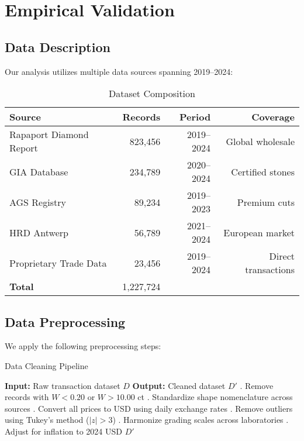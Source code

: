 \documentclass[12pt,a4paper]{article}
\begin{document}
\section{Empirical Validation}
\label{sec:empirical}

\subsection{Data Description}

Our analysis utilizes multiple data sources spanning 2019--2024:

\begin{table}[H]
\centering
\caption{Dataset Composition}
\label{tab:datasets}
\begin{tabular}{lrrr}
\toprule
\textbf{Source} & \textbf{Records} & \textbf{Period} & \textbf{Coverage} \\
\midrule
Rapaport Diamond Report & 823,456 & 2019--2024 & Global wholesale \\
GIA Database & 234,789 & 2020--2024 & Certified stones \\
AGS Registry & 89,234 & 2019--2023 & Premium cuts \\
HRD Antwerp & 56,789 & 2021--2024 & European market \\
Proprietary Trade Data & 23,456 & 2019--2024 & Direct transactions \\
\midrule
\textbf{Total} & 1,227,724 & & \\
\bottomrule
\end{tabular}
\end{table}

\subsection{Data Preprocessing}

We apply the following preprocessing steps:

\begin{algorithm}
\caption{Data Cleaning Pipeline}
\begin{algorithmic}
\STATE \textbf{Input:} Raw transaction dataset $D$
\STATE \textbf{Output:} Cleaned dataset $D'$
\STATE
{}. Remove records with $W < 0.20$ or $W > 10.00$ ct
. Standardize shape nomenclature across sources
. Convert all prices to USD using daily exchange rates
. Remove outliers using Tukey's method ($|z| > 3$)
. Harmonize grading scales across laboratories
. Adjust for inflation to 2024 USD
\RETURN $D'$
\end{algorithmic}
\end{algorithm}
\end{document}
